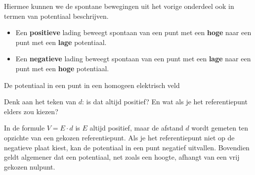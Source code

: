 \documentclass{ximera}
\begin{document}
Hiermee kunnen we de spontane bewegingen uit het vorige onderdeel ook in termen van potentiaal beschrijven.

\begin{proposition}[foldable=true,title={Spontane beweging en potentiaal}]\nl
\begin{itemize}
    \item Een \textbf{positieve} lading beweegt spontaan van een punt met een \textbf{hoge} naar een punt met een \textbf{lage} potentiaal.
    \item Een \textbf{negatieve} lading beweegt spontaan van een punt met een \textbf{lage} naar een punt met een \textbf{hoge} potentiaal.
\end{itemize}
\end{proposition}

\begin{question}
    De potentiaal in een punt in een homogeen elektrisch veld
    \begin{multipleChoice}
    \end{multipleChoice}
    \begin{hint}
        Denk aan het teken van $d$: is dat altijd positief? En wat als je het referentiepunt elders zou kiezen?
    \end{hint}
    \begin{solution}\nl
        In de formule $V = E \cdot d$ is $E$ altijd positief, maar de afstand $d$ wordt gemeten ten opzichte van een gekozen referentiepunt. Als je het referentiepunt niet op de negatieve plaat kiest, kan de potentiaal in een punt negatief uitvallen. Bovendien geldt algemener dat een potentiaal, net zoals een hoogte, afhangt van een vrij gekozen nulpunt.
    \end{solution}
\end{question}
\end{document}
